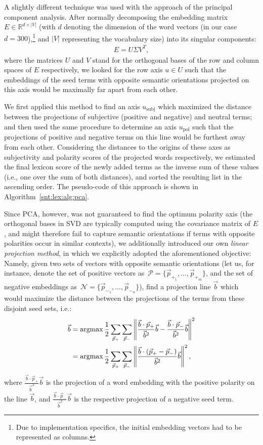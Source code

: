 A slightly different technique was used with the approach of the
principal component analysis.  After normally decomposing the
embedding matrix~$E\in\mathbb{R}^{d\times|V|}$ (with $d$ denoting the
dimension of the word vectors (in our case $d = 300$),\footnote{Due to
  implementation specifics, the initial embedding vectors had to be
  represented as columns.} and $|V|$ representing the vocabulary size)
into its singular components:
\begin{align*}
  E = U \Sigma V^T,
\end{align*}
where the matrices $U$ and $V$ stand for the orthogonal bases of the
row and column spaces of $E$ respectively, we looked for the row axis
$u\in U$ such that the embeddings of the seed terms with opposite
semantic orientations projected on this axis would be maximally far
apart from each other.

We first applied this method to find an axis $u_{\textrm{subj}}$ which
maximized the distance between the projections of subjective (positive
and negative) and neutral terms; and then used the same procedure to
determine an axis $u_{\textrm{pol}}$ such that the projections of
positive and negative terms on this line would be furthest away from
each other.  Considering the distances to the origins of these axes as
subjectivity and polarity scores of the projected words respectively,
we estimated the final lexicon score of the newly added terms as the
inverse sum of these values (i.e., one over the sum of both
distances), and sorted the resulting list in the ascending order.  The
pseudo-code of this approach is shown in
Algorithm~\ref{snt:lex:alg:pca}.

Since PCA, however, was not guaranteed to find the optimum polarity
axis (the orthogonal bases in SVD are typically computed using the
covariance matrix of $E$, and might therefore fail to capture semantic
orientations if terms with opposite polarities occur in similar
contexts), we additionally introduced our own \emph{linear projection
  method}, in which we explicitly adopted the aforementioned
objective: Namely, given two sets of vectors with opposite semantic
orientations (let us, for instance, denote the set of positive vectors
as~$\mathcal{P} = \{\vec{p}_{+_1},\ldots,\vec{p}_{+_m}\}$, and the set
of negative embeddings
as~$\mathcal{N} = \{\vec{p}_{-_1},\ldots,\vec{p}_{-_n}\}$), find a
projection line $\vec{b}$ which would maximize the distance between
the projections of the terms from these disjoint seed sets, i.e.:
{\small%
\begin{align}
  \small
  \vec{b} &=\argmax\frac{1}{2}\sum_{\vec{p}_+}\sum_{\vec{p}_-}%
  \left\lVert\frac{\vec{b}\cdot\vec{p}_+}{\vec{b}^2}\vec{b}%
  - \frac{\vec{b}\cdot\vec{p}_-}{\vec{b}^2}\vec{b}\right\rVert^2\\
  &=\argmax\frac{1}{2}\sum_{\vec{p}_+}\sum_{\vec{p}_-}\left\lVert\frac{\vec{b}%
    \cdot\left(\vec{p}_{+}-\vec{p}_{-}\right)}{\vec{b}^2}\vec{b}\right\rVert^2,\label{eq:f}%
\end{align}\normalsize}%
where $\frac{\vec{b}\cdot\vec{p}_+}{\vec{b}^2}\vec{b}$ is the
projection of a word embedding with the positive polarity on the line
$\vec{b}$, and $\frac{\vec{b}\cdot\vec{p}_-}{\vec{b}^2}\vec{b}$ is the
respective projection of a negative seed term.

